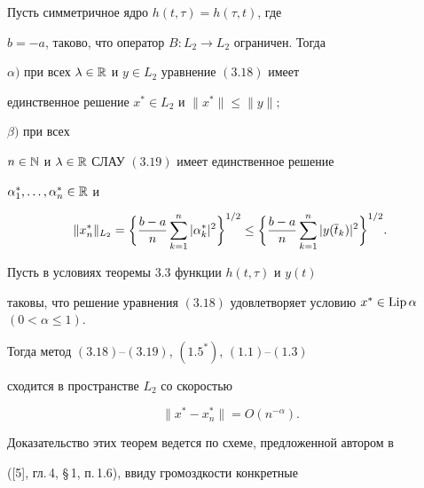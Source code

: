 \begin{thms}


Пусть симметричное ядро $h(t,\tau)=h(\tau,t)$, где


$b=-a$, таково, что оператор $B:L_2\to L_2$ ограничен. Тогда





$\alpha)$ при всех $\lambda\in \Bbb{R}$ и $y\in L_2$ уравнение $(3.18)$ имеет


единственное решение $x^*\in L_2$ и \linebreak $\|x^*\|\le \|y\|;$





$\beta)$ при всех


$n\in \Bbb N$ и $\lambda\in \Bbb{R}$ СЛАУ $(3.19)$ имеет единственное решение


$\alpha_1^*,\dotsc,\alpha_n^*\in \Bbb{R}$ и


$$


\|x^*_n\|_{L_2} =


\bigg\{\frac{b-a}{n}\suml_{k=1}^n|\alpha_k^*|^2\bigg\}^{1/2}\le


\bigg\{\frac{b-a}{n}\suml_{k=1}^n|y(\ol{t}_k)|^2\bigg\}^{1/2}.


$$


\end{thms}





\begin{thms}


Пусть в условиях теоремы $3.3$ функции $h(t,\tau)$ и $y(t)$


таковы, что решение уравнения $(3.18)$ удовлетворяет условию $x^*\in \Lip


\alpha$ $(0<\alpha \le 1)$. 


Тогда метод $(3.18)$--$(3.19)$, $(1.5^*)$, $(1.1)$--$(1.3)$


сходится в пространстве $L_2$ со скоростью


$$


\|x^*-x^*_n\|=O(n^{-\alpha}).


$$


\end{thms}





Доказательство этих теорем ведется по схеме, предложенной автором в


([5], гл.\,4, \S\,1, п.\,1.6), ввиду громоздкости конкретные 


